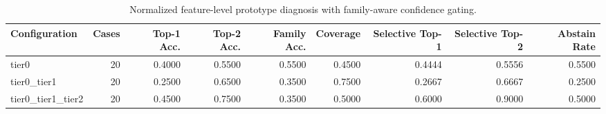 \begin{table}[t]
\centering
\caption{Normalized feature-level prototype diagnosis with family-aware confidence gating.}
\label{tab:dice_stressor_hierarchical_diagnosis}
\footnotesize
\begin{tabular}{lrrrrrrrr}
\toprule
Configuration & Cases & Top-1 Acc. & Top-2 Acc. & Family Acc. & Coverage & Selective Top-1 & Selective Top-2 & Abstain Rate \\
\midrule
tier0 & 20 & 0.4000 & 0.5500 & 0.5500 & 0.4500 & 0.4444 & 0.5556 & 0.5500 \\
tier0_tier1 & 20 & 0.2500 & 0.6500 & 0.3500 & 0.7500 & 0.2667 & 0.6667 & 0.2500 \\
tier0_tier1_tier2 & 20 & 0.4500 & 0.7500 & 0.3500 & 0.5000 & 0.6000 & 0.9000 & 0.5000 \\
\bottomrule
\end{tabular}

\end{table}
